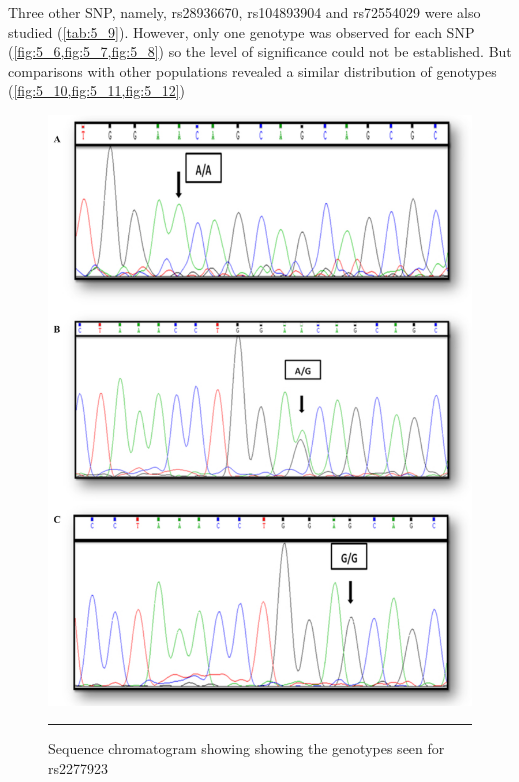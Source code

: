 \begin{refsection}
Three other SNP, namely, rs28936670, rs104893904 and rs72554029 were also studied (\cref{tab:5_9}). However, only one genotype was observed for each SNP (\cref{fig:5_6,fig:5_7,fig:5_8}) so the level of significance could not be established. But comparisons with other populations revealed a similar distribution of genotypes (\cref{fig:5_10,fig:5_11,fig:5_12}) 


\begin{figure}[!hp]
\centering
\includegraphics[width=\linewidth]{Figures/Figure5_5.pdf}
\rule{35em}{0.5pt}
\caption[Sequence chromatogram showing showing the genotypes seen for rs2277923]{Sequence chromatogram showing showing the genotypes seen for rs2277923}
\label{fig:5_5}
\end{figure}


\end{refsection}
